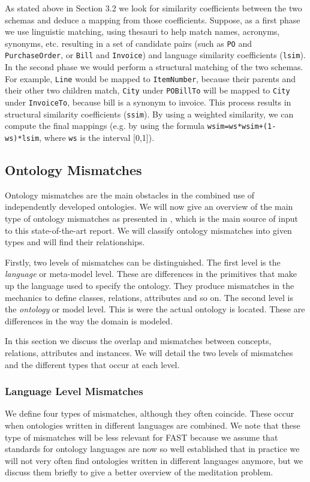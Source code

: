 As stated above in Section 3.2 we look for similarity coefficients
between the two schemas and deduce a mapping from those coefficients.
Suppose, as a first phase we use linguistic matching, using thesauri to
help match names, acronyms, synonyms, etc. resulting in a set of
candidate pairs (such as \texttt{PO} and
\texttt{PurchaseOrder}, or \texttt{Bill} and
\texttt{Invoice}) and language similarity coefficients
(\texttt{lsim}). In the second phase we would perform a
structural matching of the two schemas. For example,
\texttt{Line} would be mapped to
\texttt{ItemNumber}, because their parents and their other
two children match, \texttt{City} under
\texttt{POBillTo} will be mapped to
\texttt{City} under \texttt{InvoiceTo},
because bill is a synonym to invoice. This process results in
structural similarity coefficients (\texttt{ssim}). By
using a weighted similarity, we can compute the final mappings (e.g. by
using the formula \texttt{wsim=ws*wsim+(1-ws)*lsim}, where
\texttt{ws} is the interval [0,1]). 


\subsection{Ontology Mismatches}
\label{sec:ontologymismatches}
Ontology mismatches are the main obstacles in the combined use of
independently developed ontologies. We will now give an overview of the
main type of ontology mismatches as presented in \cite{klein2001combiningOntologies}, which
is the main source of input to this state-of-the-art report. We will
classify ontology mismatches into given types and will find their
relationships. 

Firstly, two levels of mismatches can be distinguished. The first level
is the \textit{language} or meta-model level. These are differences in
the primitives that make up the language used to specify the ontology.
They produce mismatches in the mechanics to define classes, relations,
attributes and so on. The second level is the \textit{ontology} or
model level. This is were the actual ontology is located. These are
differences in the way the domain is modeled. 

In this section we discuss the overlap and mismatches between concepts,
relations, attributes and instances. We will detail the two levels of
mismatches and the different types that occur at each level. 

\subsubsection{Language Level Mismatches}
\label{subsec:ontologymismatches_languagelevel}
We define four types of mismatches, although they often coincide. These
occur when ontologies written in different languages are combined. We
note that these type of mismatches will be less relevant for FAST
because we assume that standards for ontology languages are now so well
established that in practice we will not very often find ontologies
written in different languages anymore, but we discuss them briefly to
give a better overview of the meditation problem. 

